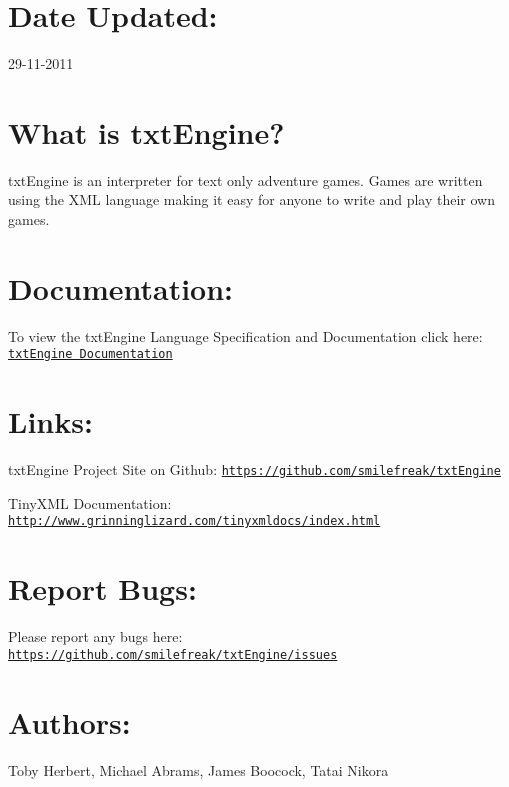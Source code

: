 \hypertarget{index_date_sec}{}\section{\-Date Updated\-:}\label{index_date_sec}
29-\/11-\/2011\hypertarget{index_about_sec}{}\section{\-What is txt\-Engine?}\label{index_about_sec}
txt\-Engine is an interpreter for text only adventure games. \-Games are written using the \-X\-M\-L language making it easy for anyone to write and play their own games.\hypertarget{index_doc_sec}{}\section{\-Documentation\-:}\label{index_doc_sec}
\-To view the txt\-Engine \-Language \-Specification and \-Documentation click here\-: \href{../DocumentationMain.pdf}{\tt txt\-Engine \-Documentation}\hypertarget{index_links_sec}{}\section{\-Links\-:}\label{index_links_sec}

\begin{DoxyItemize}
\item txt\-Engine \-Project \-Site on \-Github\-: \href{https://github.com/smilefreak/txtEngine}{\tt https\-://github.\-com/smilefreak/txt\-Engine}\par



\item \-Tiny\-X\-M\-L \-Documentation\-: \href{http://www.grinninglizard.com/tinyxmldocs/index.html}{\tt http\-://www.\-grinninglizard.\-com/tinyxmldocs/index.\-html}\par
 
\end{DoxyItemize}\hypertarget{index_bugs_sec}{}\section{\-Report Bugs\-:}\label{index_bugs_sec}
\-Please report any bugs here\-: \href{https://github.com/smilefreak/txtEngine/issues}{\tt https\-://github.\-com/smilefreak/txt\-Engine/issues}\par
\hypertarget{index_author_sec}{}\section{\-Authors\-:}\label{index_author_sec}
\-Toby \-Herbert, \-Michael \-Abrams, \-James \-Boocock, \-Tatai \-Nikora 